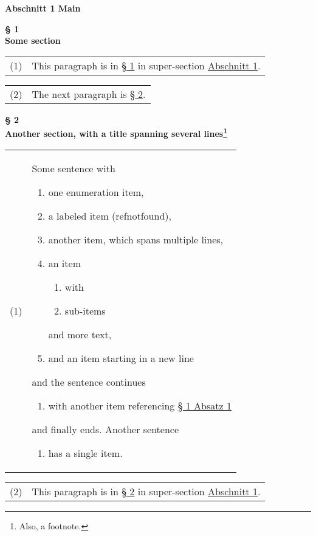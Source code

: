 \documentclass{article}\usepackage{helvet}\renewcommand{\familydefault}{\sfdefault}\usepackage[letterpaper,top=2cm,bottom=2cm,left=3cm,right=3cm,marginparwidth=1.75cm]{geometry}\usepackage[colorlinks=true,allcolors=red]{hyperref}\usepackage{enumitem}\usepackage{tabularx}\setlist[enumerate,1]{label=\arabic*., left=0pt}\setlist[enumerate,2]{label=\alph*., left=0.5em}\setlist[enumerate,3]{label=\alph*\alph*., left=1em}\setlist[enumerate,4]{label=-, left=1.5em}\setlist{nosep}\setlength{\parindent}{0pt}
\begin{document}
        \hypertarget{main}{\textbf{Abschnitt 1 Main}\\}\hypertarget{sectiona}{
        \begin{center}
                \textbf{§ 1\\Some section}
        \end{center}
}\hypertarget{paragraph}{}
        \begin{tabularx}
                {\linewidth}{@{}lX@{}}
                (1) & This paragraph is in \hyperlink{sectiona}{§ 1} in super-section \hyperlink{main}{Abschnitt 1}.
        \end{tabularx}

\medskip

        \begin{tabularx}
                {\linewidth}{@{}lX@{}}
                (2) & The next paragraph is \hyperlink{sectionb}{§ 2}.
        \end{tabularx}

\medskip
\hypertarget{sectionb}{
        \begin{center}
                \textbf{§ 2\\Another section, with a title spanning several lines\footnote{Also, a footnote.}}
        \end{center}
}
        \begin{tabularx}
                {\linewidth}{@{}lX@{}}
                (1) & Some sentence with
                \begin{enumerate}
                        \item{one enumeration item,}
                        \item{a labeled item (refnotfound),}
                        \item{another item, which spans multiple lines,}
                        \item{an item
                        \begin{enumerate}
                                \item{with}
                                \item{sub-items}
                        \end{enumerate}
and more text,}
                        \item{and an item starting in a new line}
                \end{enumerate}
and the sentence continues
                \begin{enumerate}
                        \item{with another item referencing \hyperlink{paragraph}{§ 1 Absatz 1}}
                \end{enumerate}
and finally ends. Another sentence
                \begin{enumerate}
                        \item{has a single item.}
                \end{enumerate}

        \end{tabularx}

\medskip

        \begin{tabularx}
                {\linewidth}{@{}lX@{}}
                (2) & This paragraph is in \hyperlink{sectionb}{§ 2} in super-section \hyperlink{main}{Abschnitt 1}.
        \end{tabularx}

\medskip
\end{document}
